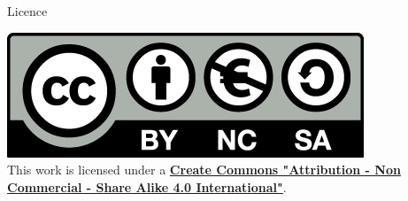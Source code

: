 \begin{frame}{}
    \begin{block}{Licence}
        \begin{center}
            \href{https://creativecommons.org/licenses/by-nc-sa/4.0/deed.el}{\includegraphics[scale=0.2]{images/cc.png}} \\
            This work is licensed under a \textbf{\href{https://creativecommons.org/licenses/by-nc-sa/4.0/deed.el}{Create Commons "Attribution - Non Commercial - Share Alike 4.0 International"}}. \\ 
        \end{center}
    \end{block}
\end{frame}

